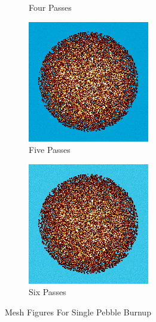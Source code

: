 \begin{figure}
\begin{subfigure}{0.25\textwidth}
  \caption{Four Passes}
  \label{fig:bstep4}
\end{subfigure}%
%
\begin{subfigure}{0.25\textwidth}
  \includegraphics[width=0.95\linewidth]{figures/burn-20-bstep5}
  \caption{Five Passes}
  \label{fig:bstep5}
\end{subfigure}%

\begin{subfigure}{0.25\textwidth}
  \includegraphics[width=0.95\linewidth]{figures/burn-20-bstep6}
  \caption{Six Passes}
  \label{fig:bstep6}
\end{subfigure}%
%
\caption{Mesh Figures For Single Pebble Burnup}
\label{fig:burn-meshes}
\end{figure}
